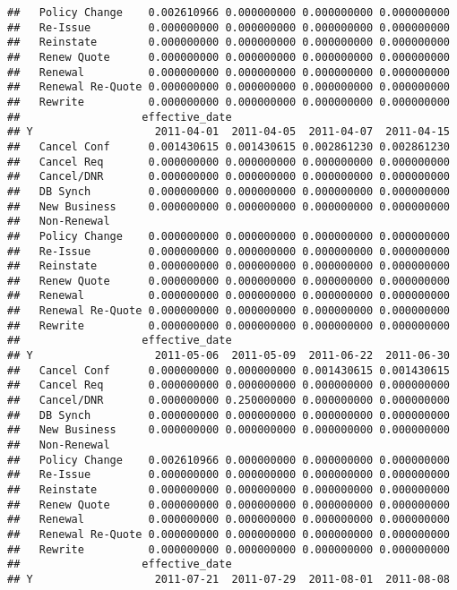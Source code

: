 \documentclass[]{article}
\begin{document}
\begin{verbatim}
##   Policy Change    0.002610966 0.000000000 0.000000000 0.000000000
##   Re-Issue         0.000000000 0.000000000 0.000000000 0.000000000
##   Reinstate        0.000000000 0.000000000 0.000000000 0.000000000
##   Renew Quote      0.000000000 0.000000000 0.000000000 0.000000000
##   Renewal          0.000000000 0.000000000 0.000000000 0.000000000
##   Renewal Re-Quote 0.000000000 0.000000000 0.000000000 0.000000000
##   Rewrite          0.000000000 0.000000000 0.000000000 0.000000000
##                   effective_date
## Y                   2011-04-01  2011-04-05  2011-04-07  2011-04-15
##   Cancel Conf      0.001430615 0.001430615 0.002861230 0.002861230
##   Cancel Req       0.000000000 0.000000000 0.000000000 0.000000000
##   Cancel/DNR       0.000000000 0.000000000 0.000000000 0.000000000
##   DB Synch         0.000000000 0.000000000 0.000000000 0.000000000
##   New Business     0.000000000 0.000000000 0.000000000 0.000000000
##   Non-Renewal                                                     
##   Policy Change    0.000000000 0.000000000 0.000000000 0.000000000
##   Re-Issue         0.000000000 0.000000000 0.000000000 0.000000000
##   Reinstate        0.000000000 0.000000000 0.000000000 0.000000000
##   Renew Quote      0.000000000 0.000000000 0.000000000 0.000000000
##   Renewal          0.000000000 0.000000000 0.000000000 0.000000000
##   Renewal Re-Quote 0.000000000 0.000000000 0.000000000 0.000000000
##   Rewrite          0.000000000 0.000000000 0.000000000 0.000000000
##                   effective_date
## Y                   2011-05-06  2011-05-09  2011-06-22  2011-06-30
##   Cancel Conf      0.000000000 0.000000000 0.001430615 0.001430615
##   Cancel Req       0.000000000 0.000000000 0.000000000 0.000000000
##   Cancel/DNR       0.000000000 0.250000000 0.000000000 0.000000000
##   DB Synch         0.000000000 0.000000000 0.000000000 0.000000000
##   New Business     0.000000000 0.000000000 0.000000000 0.000000000
##   Non-Renewal                                                     
##   Policy Change    0.002610966 0.000000000 0.000000000 0.000000000
##   Re-Issue         0.000000000 0.000000000 0.000000000 0.000000000
##   Reinstate        0.000000000 0.000000000 0.000000000 0.000000000
##   Renew Quote      0.000000000 0.000000000 0.000000000 0.000000000
##   Renewal          0.000000000 0.000000000 0.000000000 0.000000000
##   Renewal Re-Quote 0.000000000 0.000000000 0.000000000 0.000000000
##   Rewrite          0.000000000 0.000000000 0.000000000 0.000000000
##                   effective_date
## Y                   2011-07-21  2011-07-29  2011-08-01  2011-08-08

\end{verbatim}
\end{document}
